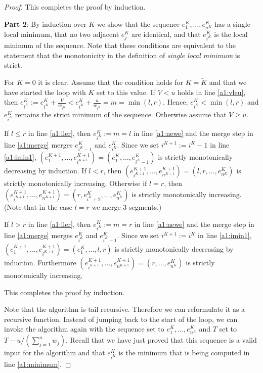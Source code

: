 \documentclass[11pt,a4paper]{article}
\begin{document}
\begin{proof}
This completes the proof by induction.

\textbf{Part 2}: By induction over $K$ we show that the sequence $e_1^K,\ldots,e_{n^K}^K$ has a single local minimum, that no two adjacent $e_j^K$ are identical, and that $e_{i^K}^K$ is the local minimum of the sequence.
Note that these conditions are equivalent to the statement that the monotonicity in the definition of \textit{single local minimum} is strict.

For $K=0$ it is clear.
Assume that the condition holds for $K = \tilde{K}$ and that we have started the loop with $K$ set to this value.
If $V < u$ holds in line \ref{a1:vleu}, then $e_{i^K}^K := e_{i^K}^K + \frac{V}{w_{i^K}} < e_{i^K}^K + \frac{u}{w_{i^K}} = m = \min(l, r)$.
Hence, $e_{i^K}^K < \min(l, r)$ and $e_{i^K}^K$ remains the strict minimum of the sequence.
Otherwise assume that $V \ge u$.

If $l \le r$ in line \ref{a1:ller}, then $e_{i^K}^K := m = l$ in line \ref{a1:newe} and the merge step in line \ref{a1:merge} merges $e_{i^K - 1}^K$ and $e_{i^K}^K$.
Since we set $i^{K+1} := i^K - 1$ in line \ref{a1:imin1},
$(e_1^{K+1},\ldots,e_{i^{K+1}}^{K+1}) = (e_1^K,\ldots,e_{i^K - 1}^K)$ is strictly monotonically decreasing by induction.
If $l < r$, then $(e_{i^{K+1}}^{K+1},\ldots,e_{n^{K+1}}^{K+1}) = (l,r,\ldots,e_{n^K}^K)$ is strictly monotonically increasing.
Otherwise if $l = r$, then $(e_{i^{K+1}}^{K+1},\ldots,e_{n^{K+1}}^{K+1}) = (r,e_{i^K+2}^K,\ldots,e_{n^K}^K)$ is strictly monotonically increasing.
(Note that in the case $l = r$ we merge 3 segments.)

If $l > r$ in line \ref{a1:ller}, then $e_{i^K}^K := m = r$ in line \ref{a1:newe} and the merge step in line \ref{a1:merge} merges $e_{i^K}^K$ and $e_{i^K + 1}^K$.
Since we set $i^{K+1} := i^K$ in line \ref{a1:imin1},
$(e_1^{K+1},\ldots,e_{i^{K+1}}^{K+1}) = (e_1^K,\ldots,l,r)$ is strictly monotonically decreasing by induction.
Furthermore $(e_{i^{K+1}}^{K+1},\ldots,e_{n^{K+1}}^{K+1}) = (r,\ldots,e_{n^K}^K)$ is strictly monotonically increasing.

This completes the proof by induction.

Note that the algorithm is tail recursive.
Therefore we can reformulate it as a recursive function.
Instead of jumping back to the start of the loop, we can invoke the algorithm again with
the sequence set to $e_1^K,\ldots,e_{n^K}^K$ and $T$ set to $T - u/(\sum_{j=1}^{n}w_j)$.
Recall that we have just proved that this sequence is a valid input for the algorithm and that $e_{i^K}^K$ is the minimum that is being computed in line \ref{a1:minimum}.


\end{proof}
\end{document}

